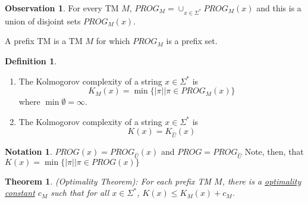 \documentclass[12pt, margin=1in]{article}
\newtheorem{theorem}{Theorem}[section]
\theoremstyle{definition}
\newtheorem*{definition}{Definition}
\newtheorem*{observation}{Observation}
\newtheorem*{notation}{Notation}
\begin{document}
\begin{observation}
    For every TM $M$, $PROG_M = \cup_{x \in \Sigma^*} PROG_M(x)$ and this is a union of disjoint sets $PROG_M(x)$.

    A prefix TM is a TM $M$ for which $PROG_M$ is a prefix set.
\end{observation}

\begin{definition}
    \begin{enumerate}
        \item The Kolmogorov complexity of a string $x \in \Sigma^*$ is $$K_M(x) = \min \{|\pi| \vert \pi \in PROG_M(x)\}$$ where $\min \emptyset = \infty$.
        \item The Kolmogorov complexity of a string $x \in \Sigma^*$ is $$K(x) = K_{\hat U}(x)$$
    \end{enumerate}
\end{definition}

\begin{notation}
    $PROG(x) = PROG_{\hat U}(x)$ and $PROG = PROG_{\hat U}$ Note, then, that $K(x) = \min \{|\pi| \vert \pi \in PROG(x)\}$
\end{notation}

\begin{theorem}
    (Optimality Theorem): For each prefix TM $M$, there is a \underline{optimality constant} $c_M$ such that for all $x \in \Sigma^*$, $K(x) \leq K_M(x) + c_M$.
\end{theorem}
\end{document}
